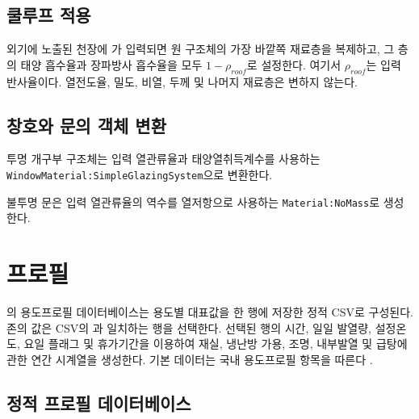 \subsection{쿨루프 적용}

외기에 노출된 천장에 가 입력되면 원 구조체의 가장 바깥쪽 재료층을 복제하고, 그 층의 태양 흡수율과 장파방사 흡수율을 모두 $1-\rho_{roof}$로 설정한다. 여기서 $\rho_{roof}$는 입력 반사율이다. 열전도율, 밀도, 비열, 두께 및 나머지 재료층은 변하지 않는다.

\subsection{창호와 문의 객체 변환}

투명 개구부 구조체는 입력 열관류율과 태양열취득계수를 사용하는 \texttt{WindowMaterial:}\allowbreak\texttt{Simple}\allowbreak\texttt{Glazing}\allowbreak\texttt{System}으로 변환한다.

불투명 문은 입력 열관류율의 역수를 열저항으로 사용하는 \texttt{Material:NoMass}로 생성한다.



\section{프로필}
\label{section:profile-conversion}

\simulator 의 용도프로필 데이터베이스는 용도별 대표값을 한 행에 저장한 정적 CSV로 구성된다.
존의  값은 CSV의 과 일치하는 행을 선택한다.
선택된 행의 시간, 일일 발열량, 설정온도, 요일 플래그 및 휴가기간을 이용하여 재실, 냉난방 가용, 조명, 내부발열 및 급탕에 관한 연간 시계열을 생성한다.
기본 데이터는 국내 용도프로필 항목을 따른다 \cite{law:usageprofile}.

\subsection{정적 프로필 데이터베이스}

